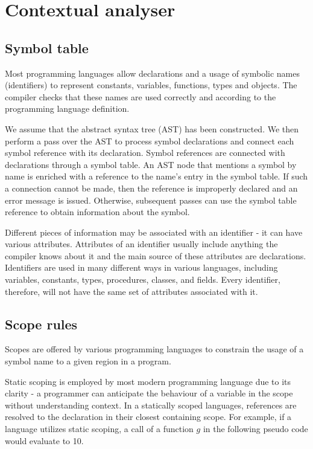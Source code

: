 \section{Contextual analyser}
\label{background:checker}

\subsection{Symbol table}
\label{sec:bg:symbol-table}
Most programming languages allow declarations and a usage of symbolic names (identifiers) to represent constants, variables, functions, types and objects. The compiler checks that these names are used correctly and according to the programming language definition. \cite[p. 179]{craftingCompiler}

\par
We assume that the abstract syntax tree (AST) has been constructed. We then perform a pass over the AST to process symbol declarations and connect each symbol reference with its declaration. Symbol references are connected with declarations through a symbol table. An AST node that mentions a symbol by name is enriched with a reference to the name’s entry in the symbol table. If such a connection cannot be made, then the reference is improperly declared and an error message is issued. Otherwise, subsequent passes can use the symbol table reference to obtain information about the symbol. \cite[p. 180]{craftingCompiler} 

\par 
Different pieces of information may be associated with an identifier - it can have various attributes. Attributes of an identifier usually include anything the compiler knows about it and the main source of these attributes are declarations. Identifiers are used in many different ways in various languages, including variables, constants, types, procedures, classes, and fields. Every identifier, therefore, will not have the same set of attributes associated with it. \cite[p. 298]{craftingCompiler} 

\subsection{Scope rules}
Scopes are offered by various programming languages to constrain the usage of a symbol name to a given region in a program. \cite[p. 282]{craftingCompiler} 

\par
Static scoping is employed by most modern programming language due to its clarity - a programmer can anticipate the behaviour of a variable in the scope without understanding context. In a statically scoped languages, references are resolved to the declaration in their closest containing scope. For example, if a language utilizes static scoping, a call of a function $\textit{g}$ in the following pseudo code would evaluate to 10.

